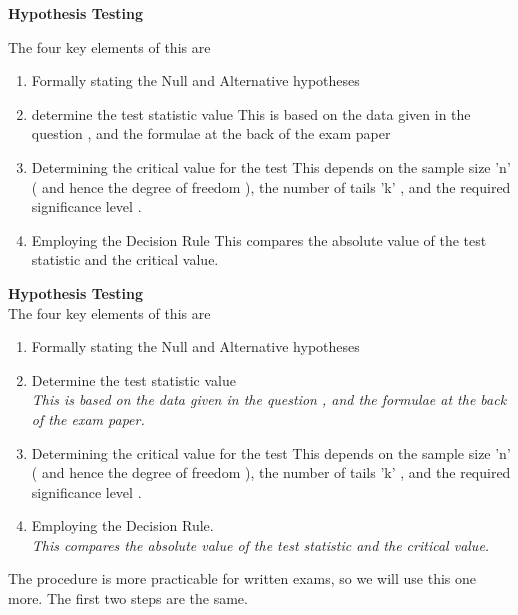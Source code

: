 \documentclass[]{report}
\begin{document}
\begin{framed}
\noindent \textbf{Hypothesis Testing}
 
 
 
 The four key elements of this are
 
 \begin{enumerate}
 \item  Formally stating the Null and Alternative hypotheses
 \item determine the test statistic value
 This is based on the data given in the question , and the formulae at the back of the exam paper
\item Determining the critical value for the test
 This depends on
 the sample size 'n'  ( and hence the degree of freedom ),
 the number of tails 'k' ,
 and the required significance level .
\item Employing the Decision Rule
 This compares the absolute value of the test statistic and the critical value.
 \end{enumerate}

 
\end{framed}
\begin{framed}
\noindent \textbf{Hypothesis Testing}\\



The four key elements of this are

\begin{enumerate}
\item  Formally stating the Null and Alternative hypotheses
\item Determine the test statistic value\\
\textit{This is based on the data given in the question , and the formulae at the back of the exam paper.} \smallskip
\item Determining the critical value for the test
This depends on
the sample size 'n'  ( and hence the degree of freedom ),
the number of tails 'k' ,
and the required significance level . \\ \smallskip
\item Employing the Decision Rule.\\
\textit{This compares the absolute value of the test statistic and the critical value.}
\end{enumerate}


\end{framed}

The procedure is more practicable for written exams, so we will use this one more. The first two steps are the same.
\end{document}
